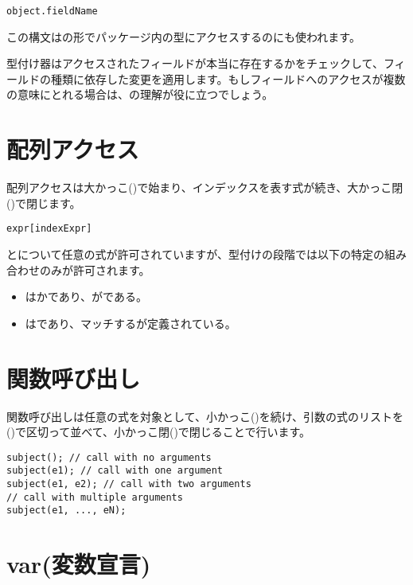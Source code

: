 \begin{lstlisting}
object.fieldName
\end{lstlisting}

この構文はの形でパッケージ内の型にアクセスするのにも使われます。

型付け器はアクセスされたフィールドが本当に存在するかをチェックして、フィールドの種類に依存した変更を適用します。もしフィールドへのアクセスが複数の意味にとれる場合は、の理解が役に立つでしょう。

\section{配列アクセス}
\label{expression-array-access}

配列アクセスは大かっこ(\expr{[})で始まり、インデックスを表す式が続き、大かっこ閉(\expr{]})で閉じます。

\begin{lstlisting}
expr[indexExpr]
\end{lstlisting}

とについて任意の式が許可されていますが、型付けの段階では以下の特定の組み合わせのみが許可されます。

\begin{itemize}
	\item {}はかであり、がである。
	\item {}はであり、マッチするが定義されている。
\end{itemize}

\section{関数呼び出し}
\label{expression-function-call}

関数呼び出しは任意の式を対象として、小かっこ(\expr{(})を続け、引数の式のリストを(\expr{,})で区切って並べて、小かっこ閉(\expr{)})で閉じることで行います。

\begin{lstlisting}
subject(); // call with no arguments
subject(e1); // call with one argument
subject(e1, e2); // call with two arguments
// call with multiple arguments
subject(e1, ..., eN);
\end{lstlisting}

\section{var(変数宣言)}
\label{expression-var}

